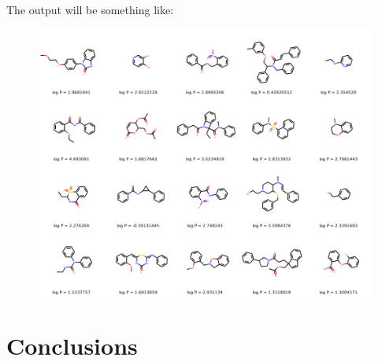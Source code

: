 \documentclass[a4paper]{article}
\begin{document}
The output will be something like:

\begin{figure}[htbp]
		\centering
			\includegraphics[width=\textwidth]{output.png}
		\label{fig:output}
	\end{figure}

\section{Conclusions}\label{sec:Conclusions}
\end{document}
